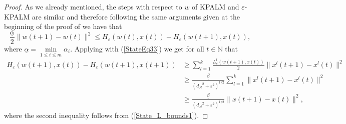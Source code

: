\documentclass[11pt]{article}
\numberwithin{equation}{section}
\begin{document}
\begin{proof}
As we already mentioned, the steps with respect to $w$ of KPALM and $\varepsilon$-KPALM  are similar and therefore following the same arguments given at the beginning of the proof of  we have that
\begin{equation}
	\frac{\underline{\alpha}}{2} \|w(t+1) - w(t)\|^2 \leq H_{\varepsilon}(w(t),x(t)) - H_{\varepsilon}(w(t+1),x(t)) , \label{StateEq37}
\end{equation}
where $\underline{\alpha} = \min\limits_{1 \leq i \leq m} \alpha_i $.
Applying  with (\ref{StateEq33}) we get for all $t \in \mathbb{N}$ that
\begin{align}
	H_{\varepsilon}(w(t+1),x(t)) - H_{\varepsilon}(w(t+1),x(t+1)) 
	&\geq \sum\limits_{l=1}^{k} \frac{L^l_{\varepsilon}(w(t+1),x(t))}{2} \|x^l(t+1)-x^l(t)\|^2 \\
	&\geq \frac{\underline{\beta}}{\left( {d_{\mathcal{A}}}^2 + {\varepsilon}^2 \right)^{1/2}} \sum\limits _{l=1}^{k} \|x^l(t+1)-x^l(t)\|^2 \\
	&\geq \frac{\underline{\beta}}{\left( {d_{\mathcal{A}}}^2 + {\varepsilon}^2 \right)^{1/2}} \|x(t+1)-x(t)\|^2 , \label{StateEq39}
\end{align}
where the second inequality follows from (\ref{State_L_bounds1}).
%

\end{proof}
\end{document}

